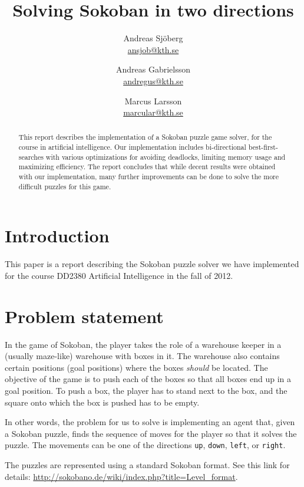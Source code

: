 \documentclass[a4paper,11pt]{article}
\title{Solving Sokoban in two directions \\ }
\author{Andreas Sjöberg \\ \url{ansjob@kth.se} 
		\and Andreas Gabrielsson \\ \url{andregus@kth.se} 
		\and Marcus Larsson \\ \url{marcular@kth.se}
	}
\begin{document}
\thispagestyle{plain}
\maketitle

\begin{abstract}
This report describes the implementation of a Sokoban puzzle game solver,
for the course in artificial intelligence.
Our implementation includes bi-directional best-first-searches with various
optimizations for avoiding deadlocks, limiting memory usage and maximizing
efficiency.
The report concludes that while decent results were obtained with our implementation,
many further improvements can be done to solve the more difficult puzzles for this game.

\end{abstract}

\clearpage

\tableofcontents

\clearpage

\section{Introduction}
This paper is a report describing the Sokoban puzzle solver we have implemented for the course
DD2380 Artificial Intelligence in the fall of 2012.

\section{Problem statement}

In the game of Sokoban, the player takes the role of a warehouse keeper in a
(usually maze-like) warehouse with boxes in it.
The warehouse also contains certain positions (goal positions) where the boxes \emph{should} be located.
The objective of the game is to push each of the boxes so that all boxes end up
in a goal position.
To push a box, the player has to stand next to the box,
and the square onto which the box is pushed has to be empty.

In other words, the problem for us to solve is implementing an agent that,
given a Sokoban puzzle, finds the sequence of moves for the player so that
it solves the puzzle.
The movements can be one of the directions \verb!up!, \verb!down!, \verb!left!, or \verb!right!.

The puzzles are represented using a standard Sokoban format. See this link for details:
\url{http://sokobano.de/wiki/index.php?title=Level_format}.
\end{document}
